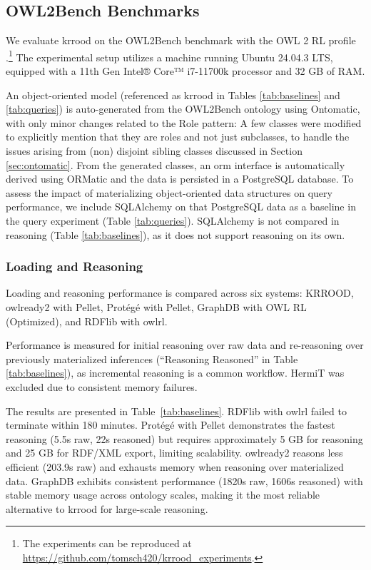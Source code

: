 \documentclass[a4paper,fleqn]{cas-sc}
\begin{document}
\subsection{OWL2Bench Benchmarks}

We evaluate \ac{krrood} on the OWL2Bench benchmark with the OWL 2 RL profile \citep{singh2020owl2bench}.\footnote{ The experiments can be reproduced at \url{https://github.com/tomsch420/krrood_experiments}.}
The experimental setup utilizes a machine running Ubuntu 24.04.3 LTS, equipped with a 11th Gen Intel® Core™ i7-11700k processor and 32 GB of RAM.

An object-oriented model (referenced as \ac{krrood} in Tables \ref{tab:baselines} and \ref{tab:queries}) is auto-generated from the OWL2Bench ontology using Ontomatic, with only minor changes related to the Role pattern: A few classes were modified to explicitly mention that they are roles and not just subclasses, to handle the issues arising from (non) disjoint sibling classes discussed in Section \ref{sec:ontomatic}. From the generated classes, an \ac{orm} interface is automatically derived using ORMatic and the data is persisted in a PostgreSQL database. To assess the impact of materializing object-oriented data structures on query performance, we include SQLAlchemy on that PostgreSQL data as a baseline in the query experiment (Table \ref{tab:queries}). SQLAlchemy is not compared in reasoning (Table \ref{tab:baselines}), as it does not support reasoning on its own.

\subsubsection{Loading and Reasoning}


Loading and reasoning performance is compared  across six systems: KRROOD, owlready2 with Pellet, Protégé with Pellet, GraphDB with OWL RL (Optimized), and RDFlib with owlrl.

Performance is measured for initial reasoning over raw data and re-reasoning over previously materialized inferences (``Reasoning Reasoned'' in Table \ref{tab:baselines}), as incremental reasoning is a common workflow. HermiT was excluded due to consistent memory failures.

The results are presented in Table~\ref{tab:baselines}. RDFlib with owlrl failed to terminate within 180 minutes. Protégé with Pellet demonstrates the fastest reasoning (5.5s raw, 22s reasoned) but requires approximately 5 GB for reasoning and 25 GB for RDF/XML export, limiting scalability. owlready2 reasons less efficient (203.9s raw) and exhausts memory when reasoning over materialized data. GraphDB exhibits consistent performance (1820s raw, 1606s reasoned) with stable memory usage across ontology scales, making it the most reliable alternative to \ac{krrood} for large-scale reasoning.
\end{document}
